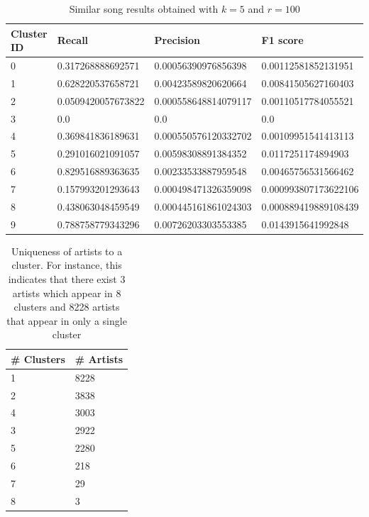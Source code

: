\documentclass[10pt,a4paper, twocolumn]{article}
\begin{document}
\begin{table}
\centering
\caption{Similar song results obtained with $k = 5$ and $r = 100$}
\begin{tabular}{@{}llll@{}}
\toprule
Cluster ID & Recall             & Precision            & F1 score             \\ \midrule
0          & 0.317268888692571  & 0.00056390976856398  & 0.00112581852131951  \\
1          & 0.628220537658721  & 0.00423589820620664  & 0.00841505627160403  \\
2          & 0.0509420057673822 & 0.000558648814079117 & 0.00110517784055521  \\
3          & 0.0                   & 0.0                     &  0.0                    \\
4          & 0.369841836189631  & 0.000550576120332702 & 0.00109951541413113  \\
5          & 0.291016021091057  & 0.00598308891384352  & 0.0117251174894903   \\
6          & 0.829516889363635  & 0.00233533887959548  & 0.00465756531566462  \\
7          & 0.157993201293643  & 0.000498471326359098 & 0.000993807173622106 \\
8          & 0.438063048459549  & 0.000445161861024303 & 0.000889419889108439 \\
9          & 0.788758779343296  & 0.00726203303553385  & 0.0143915641992848   \\ \bottomrule
\end{tabular}
\label{tab:res}
\end{table}

\begin{table}
\caption{Uniqueness of artists to a cluster. For instance, this indicates that there exist 3 artists which appear in 8 clusters and 8228 artists that appear in only a single cluster}
\centering
\begin{tabular}{@{}ll@{}}
\toprule
\# Clusters & \# Artists \\ \midrule
1             & 8228         \\
2             & 3838         \\
4             & 3003         \\
3             & 2922         \\
5             & 2280         \\
6             & 218          \\
7             & 29           \\
8             & 3            \\ \bottomrule
\end{tabular}
\label{tab:num_artists_clusters}
\end{table}
\end{document}
